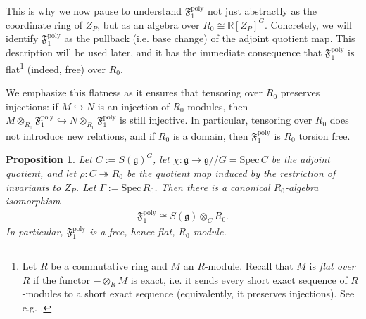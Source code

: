 \documentclass[11pt]{amsart}
\newtheorem{proposition}[theorem]{Proposition}
\theoremstyle{definition}
\theoremstyle{plain}
\theoremstyle{conclusion}
\begin{document}
This is why we now pause to understand $\mathfrak{F}_1^{\mathrm{poly}}$ not just abstractly as the coordinate ring of $Z_P$, but as an algebra over $R_0\cong \mathbb{R}[Z_P]^G$. Concretely, we will identify $\mathfrak{F}_1^{\mathrm{poly}}$ as the pullback (i.e. base change) of the adjoint quotient map. This description will be used later, and it has the immediate consequence that $\mathfrak{F}_1^{\mathrm{poly}}$ is flat\footnote{Let $R$ be a commutative ring and $M$ an $R$-module. Recall that $M$ is \emph{flat over $R$} if the functor $-\otimes_R M$ is exact, i.e. it sends every short exact sequence of $R$-modules to a short exact sequence (equivalently, it preserves injections).  See e.g. \cite[Chapter 2, Section 2]{AtiyahMacdonald}.} (indeed, free) over $R_0$.


We emphasize this flatness as it ensures that tensoring over $R_0$ preserves injections: if $M\hookrightarrow N$ is an injection of $R_0$-modules, then $M\otimes_{R_0}\mathfrak{F}_1^{\mathrm{poly}}\hookrightarrow N\otimes_{R_0}\mathfrak{F}_1^{\mathrm{poly}}$ is still injective. In particular, tensoring over $R_0$ does not introduce new relations, and if $R_0$ is a domain, then $\mathfrak{F}_1^{\mathrm{poly}}$ is $R_0$ torsion free.

\begin{proposition}
\label{prop:F1basechange}
Let $C:= S(\mathfrak{g})^G$, let $\chi:\mathfrak{g}\to \mathfrak{g}//G=\mathrm{Spec}\,C$ be the adjoint quotient, and let $\rho:C\twoheadrightarrow R_0$ be the quotient map induced by the restriction of invariants to $Z_P$. Let $\Gamma:= \mathrm{Spec}\,R_0$. %
Then there is a canonical $R_0$-algebra isomorphism
\begin{align*}
\mathfrak{F}_1^{\mathrm{poly}}\cong S(\mathfrak{g})\otimes_C R_0.
\end{align*}
In particular, $\mathfrak{F}_1^{\mathrm{poly}}$ is a free, hence flat, $R_0$-module.%
\end{proposition}
\end{document}
